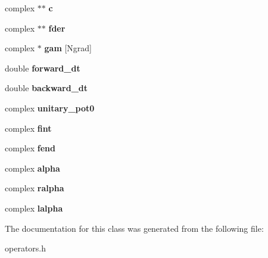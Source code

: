 \begin{DoxyCompactItemize}
complex $\ast$$\ast$ {\bfseries c}
\item 
\mbox{\label{classoperators_aa5bf1f7d0be9eeb596022b522f0ce16e}} 
complex $\ast$$\ast$ {\bfseries fder}
\item 
\mbox{\label{classoperators_ac97668afc7f6096cfe7c581ea0bf6262}} 
complex $\ast$ {\bfseries gam} \mbox{[}Ngrad\mbox{]}
\item 
\mbox{\label{classoperators_a2d86bf5deb493ba3158b2b0850f420ec}} 
double {\bfseries forward\+\_\+dt}
\item 
\mbox{\label{classoperators_a5c53a27c335e71a3d8ddde60498d417d}} 
double {\bfseries backward\+\_\+dt}
\item 
\mbox{\label{classoperators_a7a88f5d5eba5ec802807a45ca371dba1}} 
complex {\bfseries unitary\+\_\+pot0}
\item 
\mbox{\label{classoperators_a5e9d1a951ee12adb7e9e91412ef22953}} 
complex {\bfseries fint}
\item 
\mbox{\label{classoperators_aebfec83916d0a4a2564dbbca2300b863}} 
complex {\bfseries fend}
\item 
\mbox{\label{classoperators_afda9439ffc15f0650243ef5d777c34b6}} 
complex {\bfseries alpha}
\item 
\mbox{\label{classoperators_a7b4ebcf5dd3cee8cb423ce19c8759806}} 
complex {\bfseries ralpha}
\item 
\mbox{\label{classoperators_a2358e16304274518b8f157118d5513a0}} 
complex {\bfseries lalpha}
\end{DoxyCompactItemize}


The documentation for this class was generated from the following file\+:\begin{DoxyCompactItemize}
\item 
operators.\+h\end{DoxyCompactItemize}
